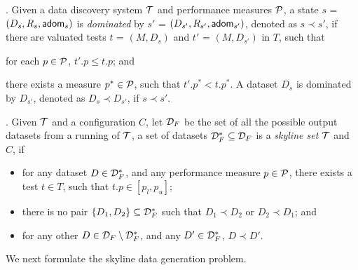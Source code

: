 . Given a data discovery system $\T$ and performance measures $\P$, %
a state $s$ 
= $(D_s, R_s, \ad_s)$ is {\em dominated} by 
$s'$ = $(D_{s'}, R_{s'}, \ad_{s'})$, 
denoted as $s\prec s'$, %
if there are valuated tests $t$ = $(M, D_s)$ 
and $t'$ = $(M, D_{s'})$ in $T$, such that 
\bi
\item for each $p\in \P$,  %
$t'.p \leq t.p$; and 
\item there exists a measure $p^*\in \P$, such that 
$t'.p^*< t.p^*$.
\ei 
A dataset $D_s$ is dominated 
by $D_{s'}$, denoted as $D_s\prec D_{s'}$, if %
$s \prec s'$. 

. 
Given $\T$ %
and a configuration $C$, let $\D_F$ be the set of all the possible output datasets from 
a running of $\T$,  a set of datasets $\D_F^*\subseteq\D_F$ is 
a {\em skyline set} \wrt $\T$ and $C$, if 
\begin{itemize}
\item for any dataset $D\in \D_F^*$, 
and any performance measure $p\in \P$, 
there exists a test $t\in T$, such that 
$t.p\in [p_l,p_u]$; 
\item  there is no pair %
$\{D_1,D_2\} \subseteq \D_F^*$   
such that $D_1 \prec D_2$ or $D_2 \prec D_1$;  
and 
\item for any other %
$D\in \D_F\setminus\D_F^*$, 
and any $D'\in \D_F^*$, 
$D\prec D'$.
\end{itemize} 
We next formulate the skyline data generation problem. 



